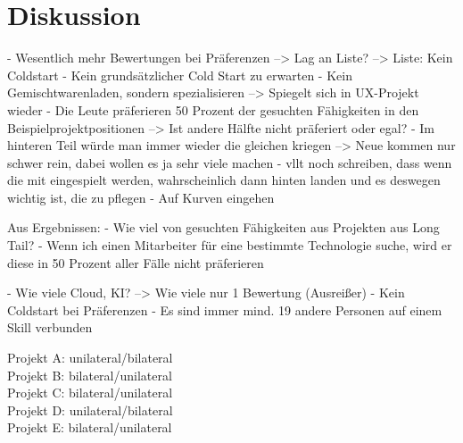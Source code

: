 \chapter{Diskussion}
\label{ch:diskussion}
- Wesentlich mehr Bewertungen bei Präferenzen --> Lag an Liste? --> Liste: Kein Coldstart
- Kein grundsätzlicher Cold Start zu erwarten
- Kein Gemischtwarenladen, sondern spezialisieren --> Spiegelt sich in UX-Projekt wieder
- Die Leute präferieren 50 Prozent der gesuchten Fähigkeiten in den Beispielprojektpositionen --> Ist andere Hälfte nicht präferiert oder egal?
- Im hinteren Teil würde man immer wieder die gleichen kriegen --> Neue kommen nur schwer rein, dabei wollen es ja sehr viele machen
- vllt noch schreiben, dass wenn die mit eingespielt werden, wahrscheinlich dann hinten landen und es deswegen wichtig ist, die zu pflegen
- Auf Kurven eingehen

Aus Ergebnissen:
- Wie viel von gesuchten Fähigkeiten aus Projekten aus Long Tail?
- Wenn ich einen Mitarbeiter für eine bestimmte Technologie suche, wird er diese in 50 Prozent aller Fälle nicht präferieren

- Wie viele Cloud, KI? --> Wie viele nur 1 Bewertung (Ausreißer)
- Kein Coldstart bei Präferenzen
- Es sind immer mind. 19 andere Personen auf einem Skill verbunden

Projekt A: unilateral/bilateral\\
Projekt B: bilateral/unilateral\\
Projekt C: bilateral/unilateral\\
Projekt D: unilateral/bilateral\\
Projekt E: bilateral/unilateral


